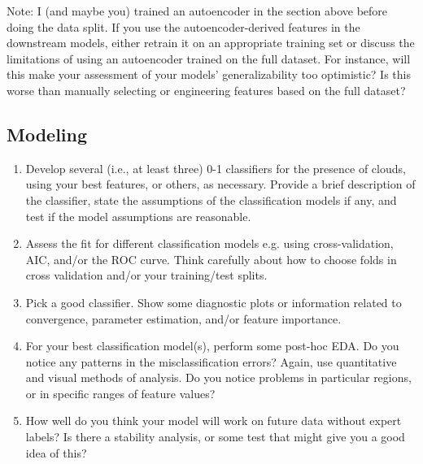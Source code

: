 \documentclass[letterpaper,12pt]{article}
\begin{document}
Note: I (and maybe you) trained an autoencoder in the section above before doing the data split. If you use the autoencoder-derived features in the downstream models, either retrain it on an appropriate training set or discuss the limitations of using an autoencoder trained on the full dataset. For instance, will this make your assessment of your models' generalizability too optimistic? Is this worse than manually selecting or engineering features based on the full dataset?

\subsection{Modeling}
\begin{enumerate}
    \item Develop several (i.e., at least three) 0-1 classifiers for the presence of clouds, using your best features, or others, as necessary. Provide a brief description of the classifier, state the assumptions of the classification models if any, and test if the model assumptions are reasonable.
    \item Assess the fit for different classification models e.g. using cross-validation, AIC, and/or the ROC curve. Think carefully about how to choose folds in cross validation and/or your training/test splits.
    \item Pick a good classifier. Show some diagnostic plots or information related to convergence, parameter estimation, and/or feature importance.
    \item For your best classification model(s), perform some post-hoc EDA. Do you notice any patterns in the misclassification errors? Again, use quantitative and visual methods of analysis. Do you notice problems in particular regions, or in specific ranges of feature values?
    \item How well do you think your model will work on future data without expert labels? Is there a stability analysis, or some test that might give you a good idea of this?
\end{enumerate}
\end{document}

